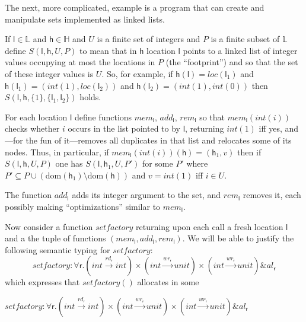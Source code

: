 \documentclass[orivec]{llncs}
\newif\iffull\fullfalse
\renewcommand{\paragraph}[1]{\noindent {\bf #1}}
\newcommand{\intt}[1]{\textit{int}(#1)}
\newcommand{\effto}[1]{\stackrel{#1}{\to}}
\newcommand{\reff}[1]{\textit{loc}(#1)}
\newcommand{\labs}{\mathbb{L}}
\newcommand{\dom}[1]{\mathrm{dom}({#1})}
\newcommand{\regid}{\ensuremath{\mathsf{r}}}
\newcommand{\Stores}{\ensuremath{\mathbb{H}}}
\newcommand{\aEff}[1]{\ensuremath{\mathit{al}_{#1}}}
\newcommand{\rEff}[1]{\ensuremath{\mathit{rd}_{#1}}}
\newcommand{\wEff}[1]{\ensuremath{\mathit{wr}_{#1}}}
\newcommand{\cloc}{\ensuremath{\mathsf{l}}\xspace}
\newcommand\heap{\ensuremath{\mathsf{h}}\xspace}
\newcommand{\ety}[2]{{#1}\mathrel{\&}{#2}}
\begin{document}
\paragraph{Set factory}
The next, more complicated, example is a program that can 
create and manipulate sets implemented as linked lists.


If $\cloc\in\labs$ and $\heap\in\Stores$ and $U$ is a finite set of
integers and $P$ is a finite subset of $\labs$ define
$S(\cloc,\heap,U,P)$ to mean that in $\heap$ location $\cloc$ points to
a linked list of integer values occupying at most the locations in $P$
(the ``footprint'') and so that the set of these integer values is
$U$. So, for example, if $\heap(\cloc)=\reff {\cloc_1}$ and
$\heap(\cloc_1)=(\intt 1,\reff{\cloc_2})$ and $\heap(\cloc_2)=(\intt
1,\intt 0)$ then $S(\cloc,\heap,\{1\}, \{\cloc_1,\cloc_2\})$ holds. 

For each location $\cloc$ define functions $\textit{mem}_\cloc$,
$\textit{add}_\cloc$, $\textit{rem}_\cloc$ so that
$\textit{mem}_\cloc(\intt i)$ checks whether $i$ occurs in the list
pointed to by $\cloc$, returning $\intt 1$ iff yes, and---for the fun
of it---removes all duplicates in that list and relocates some of its
nodes.  Thus, in particular, if $\textit{mem}_\cloc(\intt
i)(\heap)=(\heap_1,v)$ then if $S(\cloc,\heap,U,P)$ one has
$S(\cloc,\heap_1,U,P')$ for some $P'$ where $P'\subseteq
P\cup(\dom{\heap_1}\setminus\dom{\heap})$ and $v=\intt 1$ iff $i\in
U$.

The function $\textit{add}_\cloc$ adds its integer argument to the
set, and $\textit{rem}_\cloc$ removes it, each possibly making
``optimizations'' similar to $\textit{mem}_\cloc$.

Now consider a function $\textit{setfactory}$ returning upon each call
a fresh location $\cloc$ and a the tuple of functions
$(\textit{mem}_\cloc,\textit{add}_\cloc,\textit{rem}_\cloc)$.
We will be able to justify the following
 semantic typing for $\textit{setfactory}$: 
\iffull
\[
\textit{setfactory} : \forall\regid. 
\ety{(\textit{int}\effto{\rEff\regid}\textit{int})\times
(\textit{int}\effto{\wEff\regid}\textit{unit})\times
(\textit{int}\effto{\wEff\regid}\textit{unit})} {\aEff\regid}
\]
which  expresses   that  $\textit{setfactory}()$  allocates   in  some
\else

\(
\textit{setfactory} : \forall\regid. 
\ety{(\textit{int}\effto{\rEff\regid}\textit{int})\times
(\textit{int}\effto{\wEff\regid}\textit{unit})\times
(\textit{int}\effto{\wEff\regid}\textit{unit})} {\aEff\regid}
\)
\end{document}
